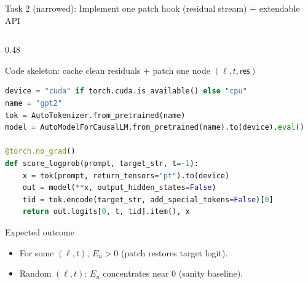 \documentclass[aspectratio=169,xcolor={dvipsnames}]{beamer}
\begin{document}
\begin{frame}[fragile,shrink=48]{Task 2 (narrowed): Implement one patch hook (residual stream) + extendable API}
\begin{columns}[T,onlytextwidth]
\begin{column}{0.48\textwidth}
\begin{block}{Code skeleton: cache clean residuals + patch one node $(\ell,t,\textsf{res})$}
\begin{lstlisting}[language=Python,basicstyle=\ttfamily\scriptsize]
device = "cuda" if torch.cuda.is_available() else "cpu"
name = "gpt2"
tok = AutoTokenizer.from_pretrained(name)
model = AutoModelForCausalLM.from_pretrained(name).to(device).eval()

@torch.no_grad()
def score_logprob(prompt, target_str, t=-1):
    x = tok(prompt, return_tensors="pt").to(device)
    out = model(**x, output_hidden_states=False)
    tid = tok.encode(target_str, add_special_tokens=False)[0]
    return out.logits[0, t, tid].item(), x
\end{lstlisting}
\end{block}

\vspace{1mm}
\begin{block}{Expected outcome}
\footnotesize
\begin{itemize}\setlength\itemsep{2pt}
\item For some $(\ell,t)$, $E_u>0$ (patch restores target logit).
\item Random $(\ell,t)$: $E_u$ concentrates near $0$ (sanity baseline).
\end{itemize}
\end{block}
\end{column}
\end{columns}
\end{frame}
\end{document}
